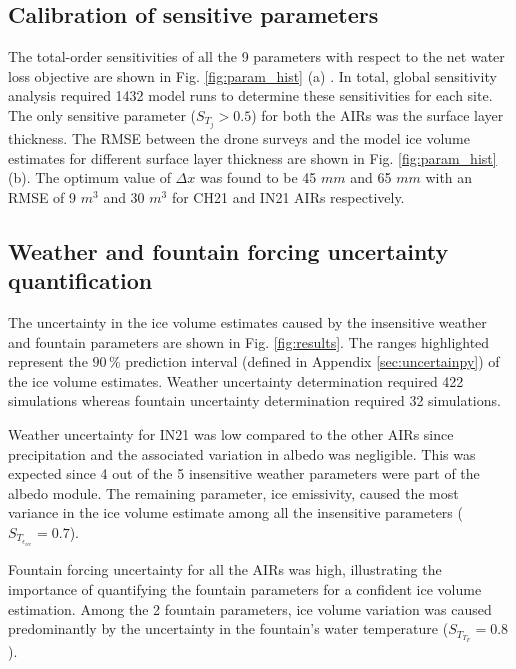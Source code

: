 \documentclass[utf8]{frontiersSCNS}
\begin{document}
\subsection{Calibration of sensitive parameters}

The total-order sensitivities of all the 9 parameters with respect to the net water loss objective are shown in
Fig. \ref{fig:param_hist} (a) . In total, global sensitivity analysis required 1432 model runs to determine these
sensitivities for each site. The only sensitive parameter ($S_{T_{j}} > 0.5$) for both the AIRs was the surface
layer thickness. The RMSE between the drone surveys and the model ice volume estimates for different surface
layer thickness are shown in Fig. \ref{fig:param_hist} (b). The optimum value of $\Delta x$ was found to be 45
$mm$ and 65 $mm$ with an RMSE of 9 $m^3$ and 30 $m^3$ for CH21 and IN21 AIRs respectively.


\subsection{Weather and fountain forcing uncertainty quantification}

The uncertainty in the ice volume estimates caused by the insensitive weather and fountain parameters are shown
in Fig. \ref{fig:results}. The ranges highlighted represent the $90\,\%$ prediction interval (defined in Appendix
\ref{sec:uncertainpy}) of the ice volume estimates. Weather uncertainty determination required 422 simulations
whereas fountain uncertainty determination required 32 simulations.

Weather uncertainty for IN21 was low compared to the other AIRs since precipitation and the associated variation
in albedo was negligible. This was expected since 4 out of the 5 insensitive weather parameters were part of the
albedo module. The remaining parameter, ice emissivity, caused the most variance in the ice volume estimate
among all the insensitive parameters ($S_{T_{\epsilon_{ice}}} = 0.7$).

Fountain forcing uncertainty for all the AIRs was high, illustrating the importance of quantifying the fountain parameters for
a confident ice volume estimation. Among the 2 fountain parameters, ice volume variation was caused predominantly
by the uncertainty in the fountain's water temperature ($S_{T_{T_F}} = 0.8$).
\end{document}
